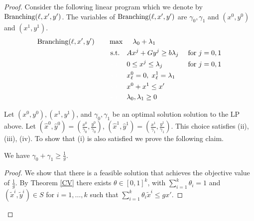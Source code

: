 \begin{proof} 
	Consider the following linear program which we denote by $\operatorname{Branching}(\ell,x',y')$. The variables of $\operatorname{Branching}(\ell,x',y')$ are $\gamma_0,\gamma_1$ and $(x^0,y^0)$ and $(x^1,y^1)$. 
	\begin{align}
		\LPC(\ell,x',y')\quad\quad& \max\quad \;\lambda_0+\lambda_1\\
		&\;\text{s.t.} \quad Ax^j + Gy^j\geq b\lambda_j & \mbox{ for $j=0,1$} \label{feasibility}\\
		&\;{\color{white}{\text{s.t.}} }\quad 0 \leq x^j \leq \lambda_j &\mbox{ for $j=0,1$}\label{bound}\\
		&\;{\color{white}{\text{s.t.}} }\quad x^0_\ell = 0,\; x^1_\ell =\lambda_1\label{branchcoordinate}\\
		&\;{\color{white}{\text{s.t.}} }\quad x^0 + x^1 \leq x'\label{packing}\\
		&\;{\color{white}{\text{s.t.}} }\quad \lambda_0,\lambda_1 \geq 0
	\end{align}
	
	Let $(x^0,y^0),(x^1,y^1)$, and $\gamma_0,\gamma_1$ be an optimal solution solution to the LP above. Let $(\hat{x}^0,\hat{y}^0) = (\frac{x^0}{\gamma_0},\frac{y^0}{\gamma_0})$, $(\hat{x}^1,\hat{y}^1) = (\frac{x^1}{\gamma_1},\frac{y^1}{\gamma_1})$. This choice satisfies  (ii), (iii), (iv). To show that (i) is also satisfied we prove the following claim.
	
	\begin{claim}\label{CVexists}
		We have $\gamma_0 + \gamma_1\geq \frac{1}{g}$.
	\end{claim}
	\begin{proof}
		We show that there is a feasible solution that achieves the objective value of $\frac{1}{g}$. By Theorem \ref{CV} there exists $\theta \in [0,1]^k$, with $\sum_{i=1}^{k}\theta_i = 1$ and $(\tilde{x}^i,\tilde{y}^i)\in S$ for $i=1,\ldots,k$ such that 
		$\sum_{i=1}^{k}\theta_i \tilde{x}^i\leq gx'$. 
		

\end{proof}
\end{proof}
